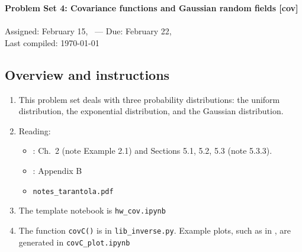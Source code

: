 \documentclass[11pt,titlepage,fleqn]{article}
\newcommand{\tfile}{{\tt hw\_cov.ipynb}}
\newcommand{\cfile}{{\tt covC\_plot.ipynb}}
\begin{document}

\begin{spacing}{1.2}
\centering
{\large \bf Problem Set 4: Covariance functions and Gaussian random fields [cov]} \\
\cltag\ \\
Assigned: February 15, \cyear\ --- Due: February 22, \cyear\ \\
Last compiled: \today
\end{spacing}


\subsection*{Overview and instructions}

\begin{enumerate}
\item This problem set deals with three probability distributions: the uniform distribution, the exponential distribution, and the Gaussian distribution.

\item Reading:
\begin{itemize}
\item \citet{Tarantola2005}: Ch.~2 (note Example 2.1) and Sections 5.1, 5.2, 5.3 (note 5.3.3).
\item \citet{Aster}: Appendix B
\item \verb+notes_tarantola.pdf+
\end{itemize}

\item The template notebook is \tfile
\item The function \verb+covC()+ is in \verb+lib_inverse.py+. Example plots, such as in , are generated in \cfile\
\end{enumerate}

\end{document}
